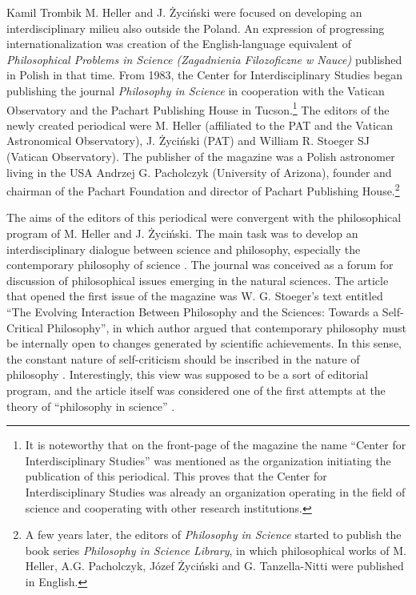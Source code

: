 \begin{artengenv}{Kamil Trombik}
M. Heller and J. Życiński were focused on developing an interdisciplinary milieu also outside the Poland. An expression
of progressing internationalization was creation of the English-language equivalent of \textit{Philosophical Problems
in Science (Zagadnienia Filozoficzne w Nauce) }published in Polish in that time. From 1983, the Center for
Interdisciplinary Studies began publishing the journal \textit{Philosophy in Science} in cooperation with the Vatican
Observatory and the Pachart Publishing House in Tucson.\footnote{It is noteworthy that on the front-page of the
magazine the name ``Center for Interdisciplinary Studies'' was mentioned as the organization initiating the publication
of this periodical. This proves that the Center for Interdisciplinary Studies was already an organization operating in
the field of science and cooperating with other research institutions.} The editors of the newly created periodical
were M. Heller (affiliated to the PAT and the Vatican Astronomical Observatory), J. Życiński (PAT) and William R.
Stoeger SJ (Vatican Observatory). The publisher of the magazine was a Polish astronomer living in the USA Andrzej G.
Pacholczyk (University of Arizona), founder and chairman of the Pachart Foundation and director of Pachart Publishing
House.\footnote{A few years later, the editors of \textit{Philosophy in Science} started to publish the book series
\textit{Philosophy in Science Library}, in which philosophical works of M. Heller, A.G. Pacholczyk, Józef Życiński and
G. Tanzella-Nitti were published in English.}

The aims of the editors of this periodical were convergent with the philosophical program of M. Heller and J. Życiński.
The main task was to develop an interdisciplinary dialogue between science and philosophy, especially the contemporary
philosophy of science
\parencite[p.8]{heller_introduction_1983}.
The
journal was conceived as a forum for discussion of philosophical issues emerging in the natural sciences. The article
that opened the first issue of the magazine was W. G. Stoeger's text entitled ``The Evolving Interaction Between
Philosophy and the Sciences: Towards a Self-Critical Philosophy'', in which author argued that contemporary philosophy
must be internally open to changes generated by scientific achievements. In this sense, the constant nature of
self-criticism should be inscribed in the nature of philosophy
\parencite[pp.39--43]{stoeger_evolving_1983}.
Interestingly, this view was supposed to
be a sort of editorial program, and the article itself was considered one of the first attempts at the theory of
``philosophy in science''
\parencites[p.7]{heller_jak_1986}[p.\pageref{heller-stoeger}]{heller_how_2019}.


\end{artengenv}
